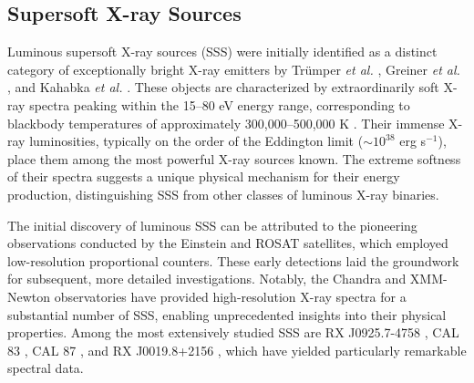         \subsection{Supersoft X-ray Sources} \label{introduction:introduction:sss}
        	Luminous supersoft X-ray sources (SSS) were initially identified as a distinct category of exceptionally bright X-ray emitters by Tr{\"u}mper \emph{et al.} \cite{trumper1991x}, Greiner \emph{et al.} \cite{greiner1991rosat}, and Kahabka \emph{et al.} \cite{kahabka06}. These objects are characterized by extraordinarily soft X-ray spectra peaking within the 15--80 eV energy range, corresponding to blackbody temperatures of approximately 300,000--500,000 K \cite{kahabka06}. Their immense X-ray luminosities, typically on the order of the Eddington limit ($\sim 10^{38}$ erg s$^{-1}$), place them among the most powerful X-ray sources known. The extreme softness of their spectra suggests a unique physical mechanism for their energy production, distinguishing SSS from other classes of luminous X-ray binaries.
        	
        	The initial discovery of luminous SSS can be attributed to the pioneering observations conducted by the Einstein and ROSAT satellites, which employed low-resolution proportional counters. These early detections laid the groundwork for subsequent, more detailed investigations. Notably, the Chandra and XMM-Newton observatories have provided high-resolution X-ray spectra for a substantial number of SSS, enabling unprecedented insights into their physical properties. Among the most extensively studied SSS are RX J0925.7-4758 \cite{beardaChandra2002AA,motchXmmNewton2002AA}, CAL 83 \cite{lanz2005}, CAL 87 \cite{orio2004}, and RX J0019.8+2156 \cite{schwarz2004}, which have yielded particularly remarkable spectral data.
        	
